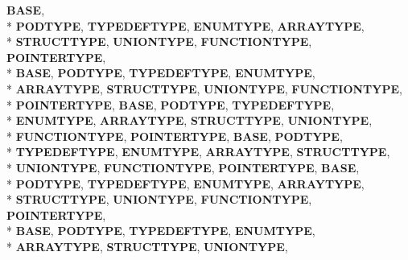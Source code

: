 \begin{DoxyCompactItemize}
{\bfseries B\-A\-S\-E}, 
\\*
{\bfseries P\-O\-D\-T\-Y\-P\-E}, 
{\bfseries T\-Y\-P\-E\-D\-E\-F\-T\-Y\-P\-E}, 
{\bfseries E\-N\-U\-M\-T\-Y\-P\-E}, 
{\bfseries A\-R\-R\-A\-Y\-T\-Y\-P\-E}, 
\\*
{\bfseries S\-T\-R\-U\-C\-T\-T\-Y\-P\-E}, 
{\bfseries U\-N\-I\-O\-N\-T\-Y\-P\-E}, 
{\bfseries F\-U\-N\-C\-T\-I\-O\-N\-T\-Y\-P\-E}, 
{\bfseries P\-O\-I\-N\-T\-E\-R\-T\-Y\-P\-E}, 
\\*
{\bfseries B\-A\-S\-E}, 
{\bfseries P\-O\-D\-T\-Y\-P\-E}, 
{\bfseries T\-Y\-P\-E\-D\-E\-F\-T\-Y\-P\-E}, 
{\bfseries E\-N\-U\-M\-T\-Y\-P\-E}, 
\\*
{\bfseries A\-R\-R\-A\-Y\-T\-Y\-P\-E}, 
{\bfseries S\-T\-R\-U\-C\-T\-T\-Y\-P\-E}, 
{\bfseries U\-N\-I\-O\-N\-T\-Y\-P\-E}, 
{\bfseries F\-U\-N\-C\-T\-I\-O\-N\-T\-Y\-P\-E}, 
\\*
{\bfseries P\-O\-I\-N\-T\-E\-R\-T\-Y\-P\-E}, 
{\bfseries B\-A\-S\-E}, 
{\bfseries P\-O\-D\-T\-Y\-P\-E}, 
{\bfseries T\-Y\-P\-E\-D\-E\-F\-T\-Y\-P\-E}, 
\\*
{\bfseries E\-N\-U\-M\-T\-Y\-P\-E}, 
{\bfseries A\-R\-R\-A\-Y\-T\-Y\-P\-E}, 
{\bfseries S\-T\-R\-U\-C\-T\-T\-Y\-P\-E}, 
{\bfseries U\-N\-I\-O\-N\-T\-Y\-P\-E}, 
\\*
{\bfseries F\-U\-N\-C\-T\-I\-O\-N\-T\-Y\-P\-E}, 
{\bfseries P\-O\-I\-N\-T\-E\-R\-T\-Y\-P\-E}, 
{\bfseries B\-A\-S\-E}, 
{\bfseries P\-O\-D\-T\-Y\-P\-E}, 
\\*
{\bfseries T\-Y\-P\-E\-D\-E\-F\-T\-Y\-P\-E}, 
{\bfseries E\-N\-U\-M\-T\-Y\-P\-E}, 
{\bfseries A\-R\-R\-A\-Y\-T\-Y\-P\-E}, 
{\bfseries S\-T\-R\-U\-C\-T\-T\-Y\-P\-E}, 
\\*
{\bfseries U\-N\-I\-O\-N\-T\-Y\-P\-E}, 
{\bfseries F\-U\-N\-C\-T\-I\-O\-N\-T\-Y\-P\-E}, 
{\bfseries P\-O\-I\-N\-T\-E\-R\-T\-Y\-P\-E}, 
{\bfseries B\-A\-S\-E}, 
\\*
{\bfseries P\-O\-D\-T\-Y\-P\-E}, 
{\bfseries T\-Y\-P\-E\-D\-E\-F\-T\-Y\-P\-E}, 
{\bfseries E\-N\-U\-M\-T\-Y\-P\-E}, 
{\bfseries A\-R\-R\-A\-Y\-T\-Y\-P\-E}, 
\\*
{\bfseries S\-T\-R\-U\-C\-T\-T\-Y\-P\-E}, 
{\bfseries U\-N\-I\-O\-N\-T\-Y\-P\-E}, 
{\bfseries F\-U\-N\-C\-T\-I\-O\-N\-T\-Y\-P\-E}, 
{\bfseries P\-O\-I\-N\-T\-E\-R\-T\-Y\-P\-E}, 
\\*
{\bfseries B\-A\-S\-E}, 
{\bfseries P\-O\-D\-T\-Y\-P\-E}, 
{\bfseries T\-Y\-P\-E\-D\-E\-F\-T\-Y\-P\-E}, 
{\bfseries E\-N\-U\-M\-T\-Y\-P\-E}, 
\\*
{\bfseries A\-R\-R\-A\-Y\-T\-Y\-P\-E}, 
{\bfseries S\-T\-R\-U\-C\-T\-T\-Y\-P\-E}, 
{\bfseries U\-N\-I\-O\-N\-T\-Y\-P\-E}, 

\end{DoxyCompactItemize}
